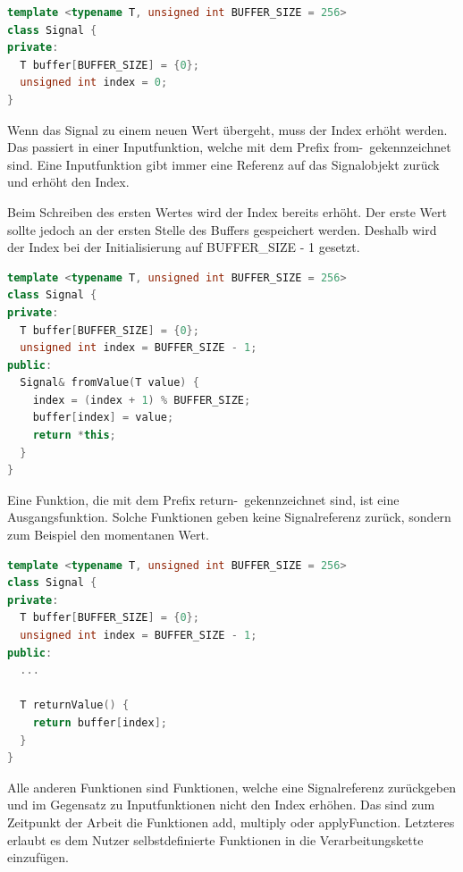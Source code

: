 \begin{lstlisting}[language=C++, 
                       frame=single, 
                       caption={Signalklasse Version 0.2},
                       captionpos=b]
template <typename T, unsigned int BUFFER_SIZE = 256>
class Signal {
private:
  T buffer[BUFFER_SIZE] = {0};
  unsigned int index = 0;
}
\end{lstlisting}

Wenn das Signal zu einem neuen Wert übergeht, muss der Index erhöht werden.
Das passiert in einer Inputfunktion, welche mit dem Prefix \glqq from-\grqq\ 
gekennzeichnet sind. Eine Inputfunktion gibt immer eine Referenz auf das 
Signalobjekt zurück und erhöht den Index.

Beim Schreiben des ersten Wertes wird der Index bereits erhöht. Der erste Wert
sollte jedoch an der ersten Stelle des Buffers gespeichert werden. Deshalb wird
der Index bei der Initialisierung auf BUFFER\_SIZE - 1 gesetzt.

\begin{lstlisting}[language=C++, 
                       frame=single, 
                       caption={Signalklasse Version 0.3},
                       captionpos=b]
template <typename T, unsigned int BUFFER_SIZE = 256>
class Signal {
private:
  T buffer[BUFFER_SIZE] = {0};
  unsigned int index = BUFFER_SIZE - 1;
public:
  Signal& fromValue(T value) {
    index = (index + 1) % BUFFER_SIZE;
    buffer[index] = value;
    return *this;
  }
}
\end{lstlisting}

Eine Funktion, die mit dem Prefix \glqq return-\grqq\ 
gekennzeichnet sind, ist eine Ausgangsfunktion. 
Solche Funktionen geben keine Signalreferenz zurück, sondern zum Beispiel den 
momentanen Wert.

\begin{lstlisting}[language=C++, 
                       frame=single, 
                       caption={Signalklasse Version 0.4},
                       captionpos=b]
template <typename T, unsigned int BUFFER_SIZE = 256>
class Signal {
private:
  T buffer[BUFFER_SIZE] = {0};
  unsigned int index = BUFFER_SIZE - 1;
public:
  ...

  T returnValue() {
    return buffer[index];
  }
}
\end{lstlisting}

Alle anderen Funktionen sind Funktionen, welche eine Signalreferenz zurückgeben
und im Gegensatz zu Inputfunktionen nicht den Index erhöhen. Das sind zum Zeitpunkt
der Arbeit die Funktionen
add, multiply oder applyFunction. Letzteres erlaubt es dem Nutzer selbstdefinierte 
Funktionen in die Verarbeitungskette einzufügen.

